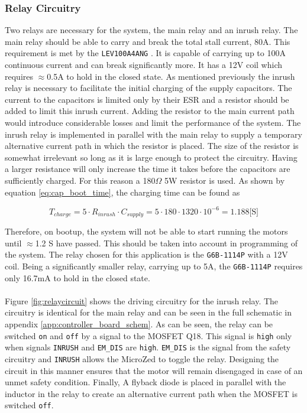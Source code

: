 \subsubsection{Relay Circuitry} %
\label{ssub:relay_circuitry}
Two relays are necessary for the system, the main relay and an inrush relay.
The main relay should be able to carry and break the total stall current, 80A.
This requirement is met by the \texttt{LEV100A4ANG} \cite{lev100}.
It is capable of carrying up to 100A continuous current and can break significantly more.
It has a 12V coil which requires $\approx$0.5A to hold in the closed state.
As mentioned previously the inrush relay is necessary to facilitate the initial charging of the supply capacitors.
The current to the capacitors is limited only by their ESR and a resistor should be added to limit this inrush current.
Adding the resistor to the main current path would introduce considerable losses and limit the performance of the system.
The inrush relay is implemented in parallel with the main relay to supply a temporary alternative current path in which the resistor is placed.
The size of the resistor is somewhat irrelevant so long as it is large enough to protect the circuitry.
Having a larger resistance will only increase the time it takes before the capacitors are sufficiently charged.
For this reason a 180$\Omega$ 5W resistor is used.
As shown by equation \ref{eq:cap_boot_time}, the charging time can be found as 

\begin{equation}
	T_{charge} = 5\cdot R_{inrush}\cdot C_{supply} = 5\cdot 180\cdot 1320\cdot10^{-6} = 1.188 \text{[S]}
\end{equation}

Therefore, on bootup, the system will not be able to start running the motors until $\approx$1.2 S have passed.
This should be taken into account in programming of the system.
The relay chosen for this application is the \texttt{G6B-1114P} \cite{g6b} with a 12V coil.
Being a significantly smaller relay, carrying up to 5A, the \texttt{G6B-1114P} requires only 16.7mA to hold in the closed state.\\~\\
Figure \ref{fig:relaycircuit} shows the driving circuitry for the inrush relay. 
The circuitry is identical for the main relay and can be seen in the full schematic in appendix \ref{app:controller_board_schem}.
As can be seen, the relay can be switched \texttt{on} and \texttt{off} by a signal to the MOSFET Q18.
This signal is \texttt{high} only when signals \texttt{INRUSH} and \texttt{EM\_DIS} are \texttt{high}.
\texttt{EM\_DIS} is the signal from the safety circuitry and \texttt{INRUSH} allows the MicroZed to toggle the relay.
Designing the circuit in this manner ensures that the motor will remain disengaged in case of an unmet safety condition.
Finally, A flyback diode is placed in parallel with the inductor in the relay to create an alternative current path when the MOSFET is switched \texttt{off}.

